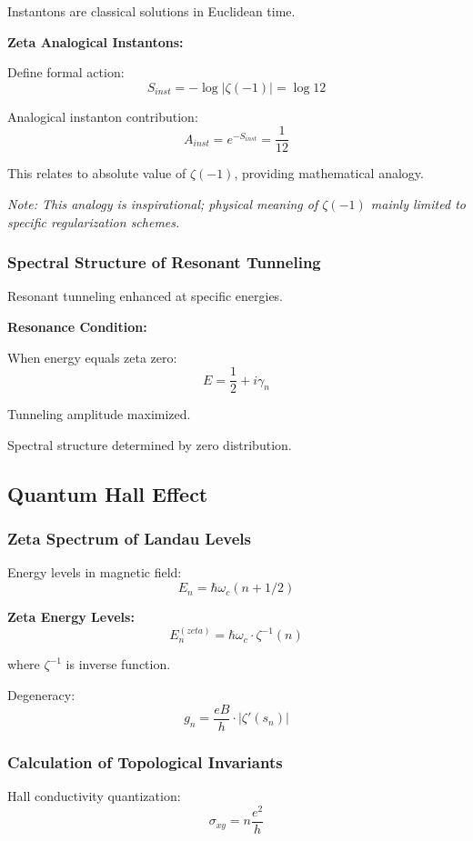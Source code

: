 \documentclass[11pt]{article}
\theoremstyle{plain}
\theoremstyle{definition}
\theoremstyle{remark}
\begin{document}
Instantons are classical solutions in Euclidean time.

\textbf{Zeta Analogical Instantons:}

Define formal action:
$$S_{inst} = -\log |\zeta(-1)| = \log 12$$

Analogical instanton contribution:
$$A_{inst} = e^{-S_{inst}} = \frac{1}{12}$$

This relates to absolute value of $\zeta(-1)$, providing mathematical analogy.

\textit{Note: This analogy is inspirational; physical meaning of $\zeta(-1)$ mainly limited to specific regularization schemes.}

\subsubsection{Spectral Structure of Resonant Tunneling}

Resonant tunneling enhanced at specific energies.

\textbf{Resonance Condition:}

When energy equals zeta zero:
$$E = \frac{1}{2} + i\gamma_n$$

Tunneling amplitude maximized.

Spectral structure determined by zero distribution.

\subsection{Quantum Hall Effect}

\subsubsection{Zeta Spectrum of Landau Levels}

Energy levels in magnetic field:
$$E_n = \hbar \omega_c (n + 1/2)$$

\textbf{Zeta Energy Levels:}
$$E_n^{(zeta)} = \hbar \omega_c \cdot \zeta^{-1}(n)$$

where $\zeta^{-1}$ is inverse function.

Degeneracy:
$$g_n = \frac{eB}{h} \cdot |\zeta'(s_n)|$$

\subsubsection{Calculation of Topological Invariants}

Hall conductivity quantization:
$$\sigma_{xy} = n \frac{e^2}{h}$$
\end{document}
